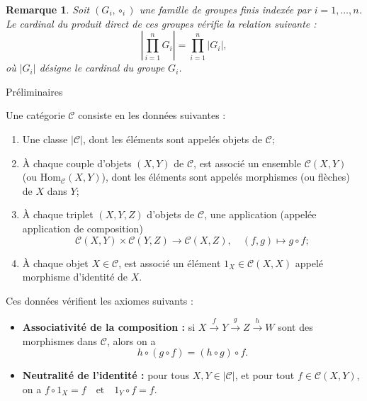 \documentclass[9pt]{beamer}
\newtheorem{remark}{Remarque}
\begin{document}
	
	
	\begin{frame}
\begin{remark}
Soit \( (G_i, \circ_i) \) une famille de groupes finis indexée par \( i = 1, \dots, n \).  
	Le cardinal du produit direct de ces groupes vérifie la relation suivante :
	\[
	\left| \prod_{i=1}^{n} G_i \right| = \prod_{i=1}^{n} |G_i|,
	\]
	où \( |G_i| \) désigne le cardinal du groupe \( G_i \).
\end{remark}
\end{frame}
	

	
	
	
	
	\begin{frame}{Préliminaires}
	\begin{definition}
		Une catégorie \( \mathcal{C} \) consiste en les données suivantes :
		\begin{enumerate}[label=\roman*)]
			\item Une classe \( |\mathcal{C}| \), dont les éléments sont appelés objets de \( \mathcal{C} \);
			\item À chaque couple d'objets \( (X, Y) \) de \( \mathcal{C} \), est associé un ensemble \( \mathcal{C}(X, Y) \) (ou \( \mathrm{Hom}_{\mathcal{C}}(X, Y) \)), dont les éléments sont appelés morphismes (ou flèches) de \( X \) dans \( Y \);
			\item À chaque triplet \( (X, Y, Z) \) d'objets de \( \mathcal{C} \), une application (appelée application de composition)
			\[
			\mathcal{C}(X, Y) \times \mathcal{C}(Y, Z) \to \mathcal{C}(X, Z), \quad (f, g) \mapsto g \circ f;
			\]
			\item À chaque objet \( X \in \mathcal{C} \), est associé un élément \( 1_X \in \mathcal{C}(X, X) \) appelé morphisme d'identité de \( X \).
		\end{enumerate}
		Ces données vérifient les axiomes suivants :
		\begin{itemize}
			\item \textbf{Associativité de la composition :}
			si \( X \xrightarrow{f} Y \xrightarrow{g} Z \xrightarrow{h} W \) sont des morphismes dans \( \mathcal{C} \), alors on a
			\[
			h \circ (g \circ f) = (h \circ g) \circ f.
			\]
			\item \textbf{Neutralité de l'identité :}
			pour tous \( X, Y \in |\mathcal{C}| \), et pour tout \( f \in \mathcal{C}(X, Y) \), on a
			\(f \circ 1_{X} = f \quad \text{et} \quad 1_{Y} \circ f = f.\)
		\end{itemize}
	\end{definition}
	\end{frame}
	
\end{document}
